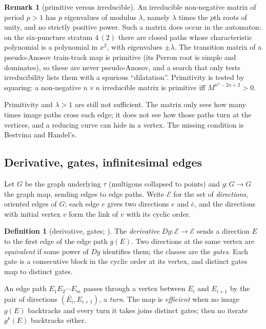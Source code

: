 \documentclass[12pt]{amsart}
\newcommand{\anti}[1]{\bar{#1}}          %
\newcommand{\trk}{\tau}                   %
\newcommand{\Dg}{D}                       %
\newcommand{\dirs}{\mathcal{E}}           %
\newcommand{\lam}{\lambda}
\theoremstyle{plain}
\theoremstyle{definition}
\newtheorem{Definition}[Theorem]{Definition}
\newtheorem{Remark}[Theorem]{Remark}
\begin{document}
\begin{Remark}[primitive versus irreducible]
  \label{rem:primitive}
  An irreducible non-negative matrix of period $p>1$ has $p$ eigenvalues
  of modulus $\lam$, namely $\lam$ times the $p$th roots of unity, and no
  strictly positive power.  Such a matrix does occur in the automaton:
  on the six-puncture stratum $4\,(2)$ there are closed paths whose
  characteristic polynomial is a polynomial in $x^2$, with eigenvalues
  $\pm\lam$.  The transition matrix of a pseudo-Anosov train-track map
  is primitive (its Perron root is simple and dominates), so these are
  never pseudo-Anosov, and a search that only tests irreducibility lists
  them with a spurious ``dilatation''.  Primitivity is tested by
  squaring: a non-negative $n\times n$ irreducible matrix is primitive
  iff $M^{n^2-2n+2}>0$.
\end{Remark}

Primitivity and $\lam>1$ are still not sufficient.  The matrix only sees
how many times image paths cross each edge; it does not see how those
paths turn at the vertices, and a reducing curve can hide in a vertex.
The missing condition is Bestvina and Handel's.

\subsection{Derivative, gates, infinitesimal edges}
Let $G$ be the graph underlying $\trk$ (multigons collapsed to points) and
$g\colon G\to G$ the graph map, sending edges to edge paths.  Write
$\dirs$ for the set of \emph{directions}, oriented edges of $G$; each edge
$e$ gives two directions $e$ and $\anti e$, and the directions with
initial vertex $v$ form the link of $v$ with its cyclic order.

\begin{Definition}[derivative, gates; {\cite[\S1]{Bestvina1995}}]
  The \emph{derivative} $\Dg g\colon\dirs\to\dirs$ sends a direction $E$
  to the first edge of the edge path $g(E)$.  Two directions at the same
  vertex are \emph{equivalent} if some power of $\Dg g$ identifies them;
  the classes are the \emph{gates}.  Each gate is a consecutive block in
  the cyclic order at its vertex, and distinct gates map to distinct
  gates.
\end{Definition}

An edge path $E_1E_2\cdots E_m$ passes through a vertex between $E_i$ and
$E_{i+1}$ by the pair of directions $(\anti{E_i},E_{i+1})$, a \emph{turn}.
The map is \emph{efficient} \cite[Lemma~3.1.2]{Bestvina1995} when no
image $g(E)$ backtracks and every turn it takes joins distinct gates;
then no iterate $g^k(E)$ backtracks either.
\end{document}
